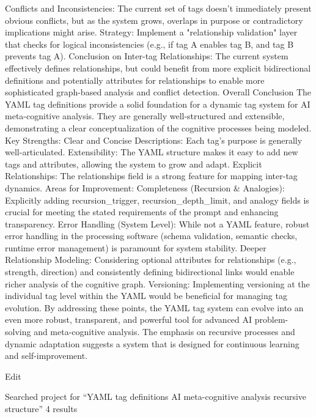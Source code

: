 {Conflicts and Inconsistencies: The current set of tags doesn't immediately present obvious conflicts, but as the system grows, overlaps in purpose or contradictory implications might arise.
Strategy: Implement a "relationship validation" layer that checks for logical inconsistencies (e.g., if tag A enables tag B, and tag B prevents tag A).
Conclusion on Inter-tag Relationships: The current system effectively defines relationships, but could benefit from more explicit bidirectional definitions and potentially attributes for relationships to enable more sophisticated graph-based analysis and conflict detection.
Overall Conclusion
The YAML tag definitions provide a solid foundation for a dynamic tag system for AI meta-cognitive analysis. They are generally well-structured and extensible, demonstrating a clear conceptualization of the cognitive processes being modeled.
Key Strengths:
Clear and Concise Descriptions: Each tag's purpose is generally well-articulated.
Extensibility: The YAML structure makes it easy to add new tags and attributes, allowing the system to grow and adapt.
Explicit Relationships: The relationships field is a strong feature for mapping inter-tag dynamics. Areas for Improvement:
Completeness (Recursion & Analogies): Explicitly adding recursion_trigger, recursion_depth_limit, and analogy fields is crucial for meeting the stated requirements of the prompt and enhancing transparency.
Error Handling (System Level): While not a YAML feature, robust error handling in the processing software (schema validation, semantic checks, runtime error management) is paramount for system stability.
Deeper Relationship Modeling: Considering optional attributes for relationships (e.g., strength, direction) and consistently defining bidirectional links would enable richer analysis of the cognitive graph.
Versioning: Implementing versioning at the individual tag level within the YAML would be beneficial for managing tag evolution. By addressing these points, the YAML tag system can evolve into an even more robust, transparent, and powerful tool for advanced AI problem-solving and meta-cognitive analysis. The emphasis on recursive processes and dynamic adaptation suggests a system that is designed for continuous learning and self-improvement.

Edit

Searched project for “YAML tag definitions AI meta-cognitive analysis recursive structure”
4 results








}
